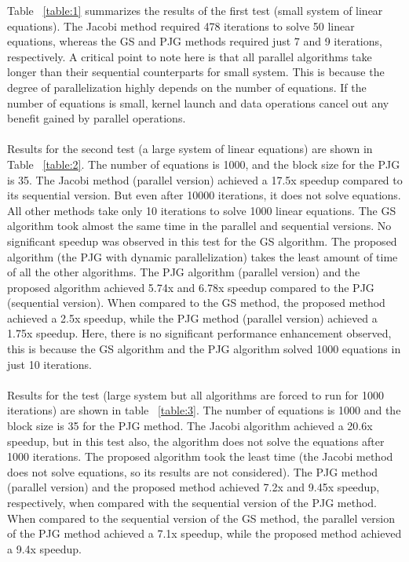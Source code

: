 \documentclass[11pt]{article}       %
\begin{document}
Table ~\ref{table:1} summarizes the results of the first test (small system of linear equations). The Jacobi method required 478 iterations to solve 50 linear equations, whereas the GS and PJG methods required just 7 and 9 iterations, respectively. A critical point to note here is that all parallel algorithms take longer than their sequential counterparts for small system. This is because the degree of parallelization highly depends on the number of equations. If the number of equations is small, kernel launch and data operations cancel out any benefit gained by parallel operations.
\\
\\
Results for the second test (a large system of linear equations) are shown in Table ~\ref{table:2}. The number of equations is 1000, and the block size for the PJG is 35. The Jacobi method (parallel version) achieved a 17.5x speedup compared to its sequential version. But even after 10000 iterations, it does not solve equations. All other methods take only 10 iterations to solve 1000 linear equations. The GS algorithm took almost the same time in the parallel and sequential versions. No significant speedup was observed in this test for the GS algorithm. The proposed algorithm (the PJG with dynamic parallelization) takes the least amount of time of all the other algorithms. The PJG algorithm (parallel version) and the proposed algorithm achieved 5.74x and 6.78x speedup compared to the PJG (sequential version). When compared to the GS method, the proposed method achieved a 2.5x speedup, while the PJG method (parallel version) achieved a 1.75x speedup. Here, there is no significant performance enhancement observed, this is because the GS algorithm and the PJG algorithm solved 1000 equations in just 10 iterations.
\\
\\
Results for the test (large system but all algorithms are forced to run for 1000 iterations) are shown in table ~\ref{table:3}. The number of equations is 1000 and the block size is 35 for the PJG method. The Jacobi algorithm achieved a 20.6x speedup, but in this test also, the algorithm does not solve the equations after 1000 iterations. The proposed algorithm took the least time (the Jacobi method does not solve equations, so its results are not considered). The PJG method (parallel version) and the proposed method achieved 7.2x and 9.45x speedup, respectively, when compared with the sequential version of the PJG method. When compared to the sequential version of the GS method, the parallel version of the PJG method achieved a 7.1x speedup, while the proposed method achieved a 9.4x speedup.
\end{document}
